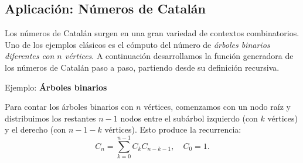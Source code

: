 






\subsection{Aplicación: Números de Catalán}

Los números de Catalán surgen en una gran variedad de contextos combinatorios. Uno de los ejemplos clásicos es el cómputo del número de \emph{árboles binarios diferentes con $n$ vértices}. A continuación desarrollamos la función generadora de los números de Catalán paso a paso, partiendo desde su definición recursiva.


\begin{exampleblock}{Ejemplo: \textbf{Árboles binarios}}
\begin{center}
\end{center}
Para contar los árboles binarios con $n$ vértices, comenzamos con un nodo raíz y distribuimos los restantes $n-1$ nodos entre el subárbol izquierdo (con $k$ vértices) y el derecho (con $n-1-k$ vértices). Esto produce la recurrencia:
$$
C_n = \sum_{k=0}^{n-1} C_k C_{n-k-1}, \quad C_0 = 1.
$$
\end{exampleblock}



